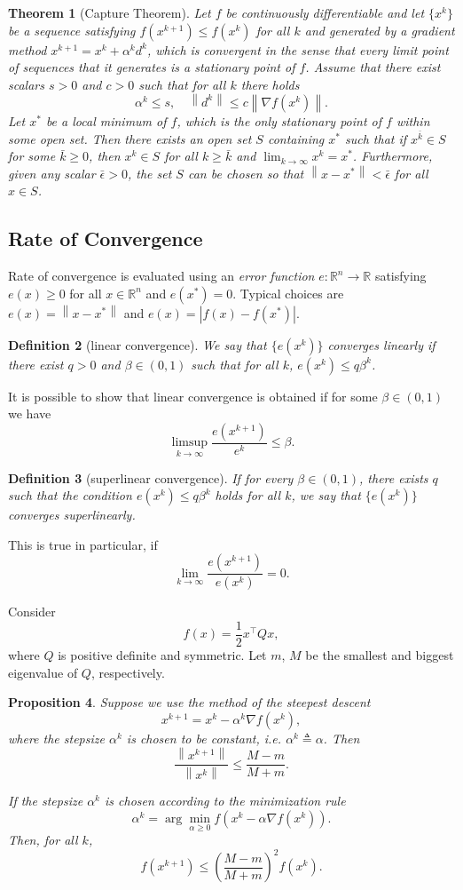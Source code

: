 \documentclass[12pt,a4paper]{report}
\numberwithin{equation}{section}
\theoremstyle{mystyle}
\newtheorem{definition}{Definition}[section]
\newtheorem{theorem}[definition]{Theorem}
\newtheorem{proposition}[definition]{Proposition}
\newcommand{\R}{\mathbb{R}}
\newcommand{\grad}{\nabla}
\newcommand{\T}{\top}
\newcommand{\abs}[1]{\left\lvert #1 \right\rvert}
\newcommand{\norm}[1]{\left\lVert #1 \right\rVert}
\begin{document}
	\begin{theorem}[Capture Theorem]
		Let $f$ be continuously differentiable and let $\{x^k\}$ be a sequence satisfying $f(x^{k+1})\leq f(x^k)$ for all $k$ and generated by a gradient method $x^{k+1}=x^k +\alpha^k d^k$, which is convergent in the sense that every limit point of sequences that it generates is a stationary point of $f$. Assume that there exist scalars $s>0$ and $c>0$ such that for all $k$ there holds
		$$
		\alpha^k \leq s,\quad \norm{d^k}\leq c\norm{\grad f(x^k)}.
		$$
		Let $x^*$ be a local minimum of $f$, which is the only stationary point of $f$ within some open set. Then there exists an open set $S$ containing $x^*$ such that if $x^{\bar{k}}\in S$ for some $\bar{k}\geq 0$, then $x^k\in S$ for all $k\geq \bar{k}$ and $\lim_{k\to\infty}x^k=x^*$. Furthermore, given any scalar $\bar{\epsilon}>0$, the set $S$ can be chosen so that $\norm{x-x^*}<\bar{\epsilon}$ for all $x\in S$.
	\end{theorem}
	
	\subsection{Rate of Convergence}
	Rate of convergence is evaluated using an \emph{error function} $e: \R^n \to \R$ satisfying $e(x)\geq 0$ for all $x\in \R^n$ and $e(x^*)=0$. Typical choices are $e(x)=\norm{x-x^*}$ and $e(x)=\abs{f(x)-f(x^*)}$.

	\begin{definition}[linear convergence]
		We say that $\{e(x^k)\}$ converges \emph{linearly} if there exist $q>0$ and $\beta\in (0,1)$ such that for all $k$, $e(x^k)\leq q \beta^k$.
	\end{definition}
	 It is possible to show that linear convergence is obtained if for some $\beta \in (0,1)$ we have
	 $$
	 \limsup_{k\to\infty}\frac{e(x^{k+1})}{e^{k}}\leq \beta.
	 $$
	 \begin{definition}[superlinear convergence]
	 	If for every $\beta\in (0,1)$, there exists $q$ such that the condition $e(x^k)\leq q\beta^k$ holds for all $k$, we say that $\{e(x^k)\}$ converges \emph{superlinearly}.
	 \end{definition}
	This is true in particular, if 
	$$
	\lim_{k\to\infty}\frac{e(x^{k+1})}{e(x^k)}=0.
	$$
	
	Consider 
	$$f(x)=\frac{1}{2}x^\T Q x,$$ where $Q$ is positive definite and symmetric. Let $m$, $M$ be the smallest and biggest eigenvalue of $Q$, respectively.
	\begin{proposition}
		Suppose we use the method of the steepest descent 
		$$
		x^{k+1}=x^k -\alpha^k \grad f(x^k),
		$$
		where the stepsize $\alpha^k$ is chosen to be constant, i.e. $\alpha^k \triangleq \alpha$. Then
		$$
		\frac{\norm{x^{k+1}}}{\norm{x^k}}\leq \frac{M-m}{M+m}.
		$$
		
		If the stepsize $\alpha^k$ is chosen according to the minimization rule
		$$
		\alpha^k=\arg\min_{\alpha\geq 0}f(x^k-\alpha \grad f(x^k)).
		$$
		Then, for all $k$,
		$$
		f(x^{k+1})\leq \left(\frac{M-m}{M+m}\right)^2 f(x^k).
		$$
	\end{proposition}
	\appendix
	
	 
\end{document}
